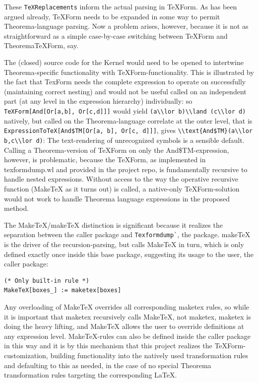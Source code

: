These \lstinline+TeXReplacements+ inform the actual parsing in TeXForm. As has been argued already, TeXForm needs to be expanded in some way to permit Theorema-language parsing. Now a problem arises, however, because it is not as straightforward as a simple case-by-case switching between TeXForm and TheoremaTeXForm, say.

The (closed) source code for the Kernel would need to be opened to intertwine Theorema-specific functionality with TeXForm-functionality. This is illustrated by the fact that TexForm needs the complete expression to operate on successfully (maintaining correct nesting) and would not be useful called on an independent part (at any level in the expression hierarchy) individually: so \lstinline+TeXForm[And[Or[a,b], Or[c,d]]]+ would yield \lstinline+(a\\lor b)\\land (c\\lor d)+ natively, but called on the Theorema-language correlate at the outer level, that is \lstinline+ExpressionToTeX[And$TM[Or[a, b], Or[c, d]]]+, gives \lstinline+\\text{And$TM}(a\\lor b,c\\lor d)+: The text-rendering of unrecognized symbols is a sensible default. Calling a Theorema-version of TeXForm on only the And\$TM-expression, however, is problematic, because the TeXForm, as implemented in texformdump.wl and provided in the project repo, is fundamentally recursive to handle nested expressions. Without access to the way the operative recursive function (MakeTeX as it turns out) is called, a native-only TeXForm-solution would not work to handle Theorema language expressions in the proposed method.

The MakeTeX/makeTeX distinction is significant because it realizes the separation between the caller package and \verb+Texformdump`+, the package. makeTeX is the driver of the recursion-parsing, but calls MakeTeX in turn, which is only defined exactly once inside this base package, suggesting its usage to the user, the caller package:

\begin{verbatim}
(* Only built-in rule *)
MakeTeX[boxes_] := maketex[boxes]
\end{verbatim} 

Any overloading of MakeTeX overrides all corresponding maketex rules, so while it is important that maketex recursively calls MakeTeX, not maketex, maketex is doing the heavy lifting, and MakeTeX allows the user to override definitions at any expression level. MakeTeX-rules can also be defined inside the caller package in this way and it is by this mechanism that this project realizes the TeXForm-customization, building functionality into the natively used transformation rules and defaulting to this as needed, in the case of no special Theorema transformation rules targeting the corresponding LaTeX.

